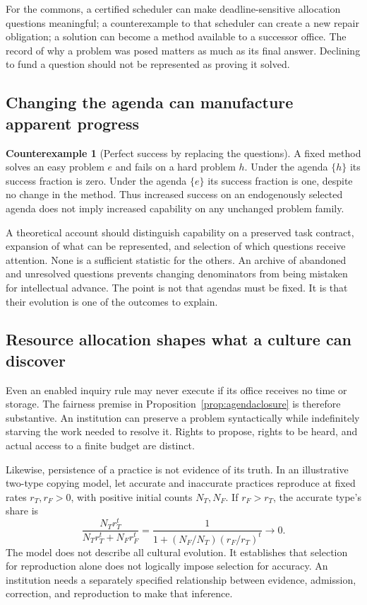 \documentclass[11pt,letterpaper]{article}
\theoremstyle{plain}
\theoremstyle{definition}
\newtheorem{counterexample}[proposition]{Counterexample}
\theoremstyle{remark}
\begin{document}
For the commons, a certified scheduler can make deadline-sensitive allocation questions meaningful; a counterexample to that scheduler can create a new repair obligation; a solution can become a method available to a successor office. The record of why a problem was posed matters as much as its final answer. Declining to fund a question should not be represented as proving it solved.

\subsection{Changing the agenda can manufacture apparent progress}
\begin{counterexample}[Perfect success by replacing the questions]\label{ex:agendadrift}
A fixed method solves an easy problem $e$ and fails on a hard problem $h$. Under the agenda $\{h\}$ its success fraction is zero. Under the agenda $\{e\}$ its success fraction is one, despite no change in the method. Thus increased success on an endogenously selected agenda does not imply increased capability on any unchanged problem family.
\end{counterexample}

A theoretical account should distinguish capability on a preserved task contract, expansion of what can be represented, and selection of which questions receive attention. None is a sufficient statistic for the others. An archive of abandoned and unresolved questions prevents changing denominators from being mistaken for intellectual advance. The point is not that agendas must be fixed. It is that their evolution is one of the outcomes to explain.

\subsection{Resource allocation shapes what a culture can discover}
Even an enabled inquiry rule may never execute if its office receives no time or storage. The fairness premise in Proposition~\ref{prop:agendaclosure} is therefore substantive. An institution can preserve a problem syntactically while indefinitely starving the work needed to resolve it. Rights to propose, rights to be heard, and actual access to a finite budget are distinct.

Likewise, persistence of a practice is not evidence of its truth. In an illustrative two-type copying model, let accurate and inaccurate practices reproduce at fixed rates $r_T,r_F>0$, with positive initial counts $N_T,N_F$. If $r_F>r_T$, the accurate type's share is
\[
\frac{N_T r_T^t}{N_T r_T^t+N_F r_F^t}
=\frac{1}{1+(N_F/N_T)(r_F/r_T)^t}\longrightarrow0.
\]
The model does not describe all cultural evolution. It establishes that selection for reproduction alone does not logically impose selection for accuracy. An institution needs a separately specified relationship between evidence, admission, correction, and reproduction to make that inference.
\end{document}
